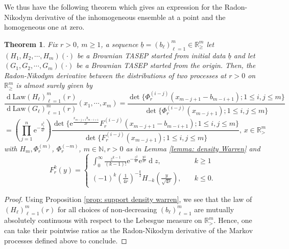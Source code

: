 \documentclass[11pt, reqno]{amsart}
\numberwithin{equation}{section}
\newcounter{dummy} \numberwithin{dummy}{section}
\newtheorem{theorem}[dummy]{Theorem}
\newcommand{\N}{\ensuremath{\mathbb{N}}}
\newcommand{\R}{\ensuremath{\mathbb{R}}}
\newcommand{\diff}{\ensuremath{\operatorname{d}\!}}
\begin{document}
We thus have the following theorem which gives an expression for the Radon-Nikodym  derivative of the inhomogeneous ensemble at a point and the homogeneous one at zero.
\begin{theorem}\label{thm: Radon-Nikodym  density inhom BLPP}
Fix $r>0$, $m\ge 1$, a sequence $\underline{b}= (b_\ell)_{\ell =1}^m \in\R^m_{\ge}$  let $(H_1, H_2, \cdots, H_m)(\cdot)$ be a Brownian TASEP started from initial data $\underline{b}$ and  let $(G_1, G_2, \cdots, G_m)(\cdot)$ be a Brownian TASEP started from the origin. Then, the Radon-Nikodym  derivative between the distributions of two processes at $r>0$ on $\R^m_\ge$ is almost surely given by
\begin{equation*}
      \frac{\diff \mathrm{Law}(H_\ell)_{\ell =1}^m(r)}{\diff\mathrm{Law}(G_\ell)_{\ell =1}^m(r)}(x_1, \cdots, x_m)  = \frac{\det \bigl\{ \Phi_r^{(i-j)}(x_{m-j+1}-b_{m-i+1}); 1 \leq i,j \leq m \bigr\}}{\det \bigl\{ \Phi_r^{(i-j)}(x_{m-j+1}); 1 \leq i,j \leq m \bigr\}}
\end{equation*}
\begin{equation}\label{eq: RN ratio}
     = \left(\displaystyle\prod_{j=1}^n\mathrm{e}^{-\frac{b_j^2}{4r}} \right)\frac{\det \bigl\{ \mathrm{e}^{\frac{x_{m-j+1}b_{m-i+1}}{2r}}{F_r^{(i-j)}}(x_{m-j+1}-b_{m-i+1}); 1 \leq i,j \leq m \bigr\}}{\det \bigl\{ F_r^{(i-j)}(x_{m-j+1}); 1 \leq i,j \leq m \bigr\}}
    ,\, x\in \R^m_>
\end{equation}
with $H_m, \Phi^{(m)}_r$, $\Phi^{(-m)}_r$, $m\in \N, r>0$ as in Lemma \ref{lemma: density Warren} and 
\begin{equation*}
    F_r^{k}(y) = \begin{cases}
        \int_0^\infty \frac{z^{k-1}}{(k-1)!} \mathrm{e}^{-\frac{z^2}{4r}}\mathrm{e}^{\frac{yz}{2r}}\diff z, \quad & k\ge 1\\
        (-1)^k \left(\frac{1}{4r}\right)^{-\frac{k}{2}}H_{-k}\left(\frac{y}{\sqrt{4r}}\right), \quad & k \le 0.
    \end{cases}
\end{equation*}
\end{theorem}

\begin{proof}
    Using Proposition \ref{prop: support density warren}, we see that the law of $(H_\ell)_{\ell =1}^m(r)$ for all choices of non-decreasing $(b_\ell)_{\ell =1}^m$ are mutually absolutely continuous with respect to the Lebesgue measure on $\R^m_>$. Hence, one can take their pointwise ratios as the Radon-Nikodym derivative of the Markov processes defined above to conclude.
\end{proof}
\end{document}
